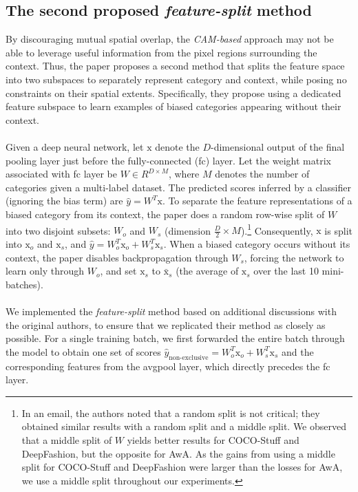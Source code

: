 \subsection{The second proposed \emph{feature-split} method}

By discouraging mutual spatial overlap, the \emph{CAM-based} approach may not be able to leverage useful information from the pixel regions surrounding the context. Thus, the paper proposes a second method that splits the feature space into two subspaces to separately represent category and context, while posing no constraints on their spatial extents. Specifically, they propose using a dedicated feature subspace to learn examples of biased categories appearing without their context.\\
\\
Given a deep neural network, let $\mathrm{x}$ denote the $D$-dimensional output of the final pooling layer just before the fully-connected (fc) layer. Let the weight matrix associated with fc layer be $W \in R^{D \times M}$, where $M$ denotes the number of categories given a multi-label dataset. The predicted scores inferred by a classifier (ignoring the bias term) are $\hat{y}=W^T \mathrm{x}$. To separate the feature representations of a biased category from its context, the paper does a random row-wise split of $W$ into two disjoint subsets: $W_o$ and $W_s$ (dimension $\frac{D}{2}\times M$).\footnote{In an email, the authors noted that a random split is not critical; they obtained similar results with a random split and a middle split. We observed that a middle split of $W$ yields better results for COCO-Stuff and DeepFashion, but the opposite for AwA. As the gains from using a middle split for COCO-Stuff and DeepFashion were larger than the losses for AwA, we use a middle split throughout our experiments.} Consequently, $\mathrm{x}$ is split into $\mathrm{x}_o$ and $\mathrm{x}_s$, and $\hat{y}=W^T_o \mathrm{x}_o + W^T_s \mathrm{x}_s$. When a biased category occurs without its context, the paper disables backpropagation through $W_s$, forcing the network to learn only through $W_o$, and set $\mathrm{x}_s$ to $\bar{\mathrm{x}}_s$ (the average of $\mathrm{x}_s$ over the last 10 mini-batches).\\
\\
We implemented the \emph{feature-split} method based on additional discussions with the original authors, to ensure that we replicated their method as closely as possible. For a single training batch, we first forwarded the entire batch through the model to obtain one set of scores $\hat{y}_{\text{non-exclusive}}=W^T_o \mathrm{x}_o + W^T_s \mathrm{x}_s$ and the corresponding features from the avgpool layer, which directly precedes the fc layer. 
